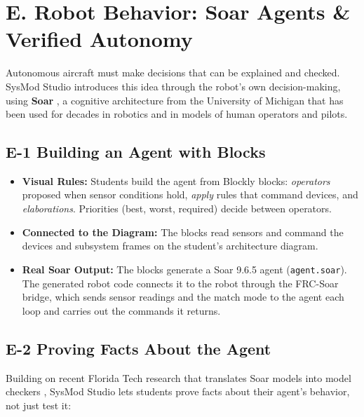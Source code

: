 \documentclass[11pt,letterpaper]{article}
\begin{document}
\section*{\Large {E. Robot Behavior: Soar Agents \& Verified Autonomy}}\label{sec:E}
Autonomous aircraft must make decisions that can be explained and checked. SysMod Studio introduces this idea through the robot's own decision-making, using \textbf{Soar} \cite{soar}, a cognitive architecture from the University of Michigan that has been used for decades in robotics and in models of human operators and pilots.

\subsection*{\normalsize {E-1 Building an Agent with Blocks}}\label{sec:E1}
\begin{itemize}
    \item \textbf{Visual Rules:} Students build the agent from Blockly blocks: \emph{operators} proposed when sensor conditions hold, \emph{apply} rules that command devices, and \emph{elaborations}. Priorities (best, worst, required) decide between operators.
    \item \textbf{Connected to the Diagram:} The blocks read sensors and command the devices and subsystem frames on the student's architecture diagram.
    \item \textbf{Real Soar Output:} The blocks generate a Soar 9.6.5 agent (\texttt{agent.soar}). The generated robot code connects it to the robot through the FRC-Soar bridge, which sends sensor readings and the match mode to the agent each loop and carries out the commands it returns.
\end{itemize}

\subsection*{\normalsize {E-2 Proving Facts About the Agent}}\label{sec:E2}
Building on recent Florida Tech research that translates Soar models into model checkers \cite{soar2prism}, SysMod Studio lets students prove facts about their agent's behavior, not just test it:
\end{document}

